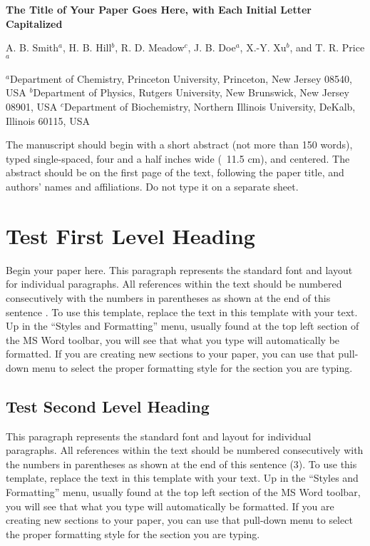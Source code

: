 \documentclass[twoside,onecolumn,12pt]{article}
\begin{document}
\begin{center}
\textbf{The Title of Your Paper Goes Here, with Each Initial Letter Capitalized}
\end{center}%
\begin{center}
A. B. Smith\textit{$^{a}$}, H. B. Hill\textit{$^{b}$}, R. D. Meadow\textit{$^{c}$}, J. B. Doe\textit{$^{a}$}, X.-Y. Xu\textit{$^{b}$}, and T. R. Price\textit{$^{a}$} %
\end{center}
\begin{center}
\textit{$^{a}$}Department of Chemistry, Princeton University, Princeton, New Jersey 08540, USA \newline
\textit{$^{b}$}Department of Physics, Rutgers University, New Brunswick, New Jersey 08901, USA \newline
\textit{$^{c}$}Department of Biochemistry, Northern Illinois University, DeKalb, Illinois 60115, USA
\end{center}

\begin{center}
\parbox{11.5cm}{The manuscript should begin with a short abstract (not more than 150 words), typed single-spaced, four and a half inches wide (~11.5 cm), and centered. The abstract should be on the first page of the text, following the paper title, and authors’ names and affiliations. Do not type it on a separate sheet.}
\end{center}

\section{Test First Level Heading} %
\noindent Begin your paper here. This paragraph represents the standard font and layout for individual paragraphs. All references within the text should be numbered consecutively with the numbers in parentheses as shown at the end of this sentence \autocite{hartree1928}. To use this template, replace the text in this template with your text. Up in the “Styles and Formatting” menu, usually found at the top left section of the MS Word toolbar, you will see that what you type will automatically be formatted. If you are creating new sections to your paper, you can use that pull-down menu to select the proper formatting style for the section you are typing. 

\subsection{Test Second Level Heading}
This paragraph represents the standard font and layout for individual paragraphs. All references within the text should be numbered consecutively with the numbers in parentheses as shown at the end of this sentence (3). To use this template, replace the text in this template with your text. Up in the “Styles and Formatting” menu, usually found at the top left section of the MS Word toolbar, you will see that what you type will automatically be formatted. If you are creating new sections to your paper, you can use that pull-down menu to select the proper formatting style for the section you are typing.
\end{document}
